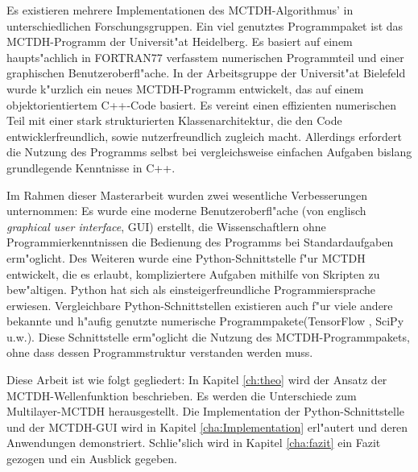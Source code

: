 Es existieren mehrere Implementationen des MCTDH-Algorithmus' in unterschiedli\-chen Forschungsgruppen.
Ein viel genutztes Programmpaket ist das MCTDH-Programm der Universit"at Heidelberg\cite{Heidelberg}. Es
basiert auf einem haupts"achlich in FORTRAN77 verfasstem numerischen Programmteil und einer
graphischen Benutzeroberfl"ache. In der Arbeitsgruppe der Universit"at Bielefeld wurde k"urzlich
ein neues MCTDH-Programm entwickelt, das auf einem objektorientiertem C++-Code basiert.
Es vereint einen effizienten numerischen Teil mit einer stark strukturierten Klassenarchitektur,
die den Code entwicklerfreundlich, sowie nutzerfreundlich zugleich macht. Allerdings erfordert
die Nutzung des Programms selbst bei vergleichsweise einfachen Aufgaben bislang
grundlegende Kenntnisse in C++.

Im Rahmen dieser Masterarbeit wurden zwei wesentliche Verbesserungen unternommen: 
Es wurde eine moderne Benutzeroberfl"ache (von englisch \textit{graphical user interface}, GUI) erstellt,
die Wissenschaftlern ohne Programmierkenntnissen die Bedienung des Programms bei Standardaufgaben erm"oglicht.
Des Weiteren wurde eine Python-Schnittstelle f"ur MCTDH entwickelt,
die es erlaubt, kompliziertere Aufgaben mithilfe von Skripten zu bew"altigen.
Python hat sich als einsteigerfreundliche Programmiersprache erwiesen. 
Vergleichbare Python-Schnittstellen existieren auch f"ur viele andere bekannte und h"aufig genutzte 
numerische Programmpakete(TensorFlow \cite{TensorFlow}, SciPy \cite{SciPy} u.w.).
Diese Schnittstelle erm"oglicht die Nutzung des MCTDH-Programmpakets, ohne dass 
dessen Programmstruktur verstanden werden muss.
 
Diese Arbeit ist wie folgt gegliedert: In Kapitel \ref{ch:theo} wird der Ansatz der MCTDH-Wellenfunk\-tion beschrieben. 
Es werden die Unterschiede zum Multilayer-MCTDH herausgestellt. Die Implementation der
Python-Schnittstelle und der MCTDH-GUI wird
in Kapitel \ref{cha:Implementation} erl"autert und deren Anwendungen demonstriert.
Schlie"slich wird in Kapitel \ref{cha:fazit} ein Fazit gezogen und ein Ausblick gegeben.     
